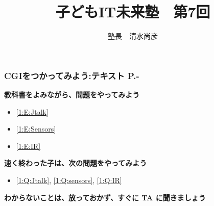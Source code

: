\documentclass[dvipdfmx]{beamer}
\title{子どもIT未来塾　第7回}
\author{塾長　清水尚彦}
\begin{document}

\begin{frame}[fragile]
	\frametitle{CGIをつかってみよう:テキスト P.\pageref{1:P:CGI}-~~~}
      \large\textbf{教科書をよみながら、問題をやってみよう}
				\begin{itemize}
					\item \ref*{1:E:Jtalk}
					\item \ref*{1:E:Sensors}
					\item \ref*{1:E:IR} 
				\end{itemize}
        \vfill
        \large\textbf{速く終わった子は、次の問題をやってみよう}
                \begin{itemize}
                    \item \ref*{1:Q:Jtalk}, \ref*{1:Q:sensors}, \ref*{1:Q:IR}
                \end{itemize}
        \vfill
      \large\textbf{わからないことは、放っておかず、すぐに TA に聞きましょう}
\end{frame}
\end{document}
